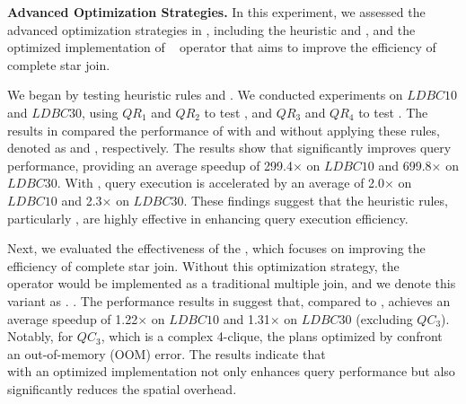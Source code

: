 \noindent\textbf{Advanced Optimization Strategies.}
In this experiment, we assessed the advanced optimization strategies in \name, including the heuristic \filterrule and \joinfuserule, and the optimized implementation of \expandintersect~ operator that aims to improve the efficiency of complete star join.

We began by testing heuristic rules \filterrule and \joinfuserule. %
We conducted experiments on $LDBC10$ and $LDBC30$, using $QR_1$ and $QR_2$ to test \filterrule, and $QR_3$ and $QR_4$ to test \joinfuserule. The results in  compared the performance of \name with and without applying these rules, denoted as \name and \relgonofi, respectively.
The results show that \filterrule significantly improves query performance, providing an average speedup of 299.4$\times$ on $LDBC10$ and 699.8$\times$ on $LDBC30$. With \joinfuserule, query execution is accelerated by an average of 2.0$\times$ on $LDBC10$ and 2.3$\times$ on $LDBC30$. These findings suggest that the heuristic rules, particularly \filterrule, are highly effective in enhancing query execution efficiency.


Next, we evaluated the effectiveness of the \expandintersect, which focuses on improving the efficiency of complete star join. Without this optimization strategy, the \expandintersect~ operator would be implemented as a traditional multiple join, and we denote this variant as \relgomj.
.
The performance results in  suggest that, compared to \relgomj, \name achieves an average speedup of 1.22$\times$ on $LDBC10$ and 1.31$\times$ on $LDBC30$ (excluding $QC_3$). Notably, for $QC_3$, which is a complex 4-clique, the plans optimized by \relgomj confront an out-of-memory (OOM) error. %
The results indicate that \expandintersect~\\ with an optimized implementation not only enhances query performance but also significantly reduces the spatial overhead.

